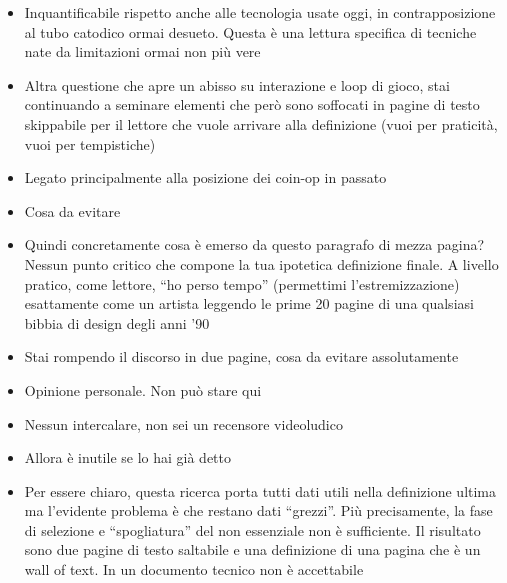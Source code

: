 {\begin{itemize}
  \item {} Inquantificabile rispetto anche alle tecnologia usate oggi, in contrapposizione al tubo catodico ormai desueto. Questa è una lettura specifica di tecniche nate da limitazioni ormai non più vere
  \item {} Altra questione che apre un abisso su interazione e loop di gioco, stai continuando a seminare elementi che però sono soffocati in pagine di testo skippabile per il lettore che vuole arrivare alla definizione (vuoi per praticità, vuoi per tempistiche)
  \item {} Legato principalmente alla posizione dei coin-op in passato
  \item {} Cosa da evitare
  \item {} Quindi concretamente cosa è emerso da questo paragrafo di mezza pagina? Nessun punto critico che compone la tua ipotetica definizione finale. A livello pratico, come lettore, ``ho perso tempo'' (permettimi l'estremizzazione) esattamente come un artista leggendo le prime 20 pagine di una qualsiasi bibbia di design degli anni '90
  \item {} Stai rompendo il discorso in due pagine, cosa da evitare assolutamente
  \item {} Opinione personale. Non può stare qui
  \item {} Nessun intercalare, non sei un recensore videoludico
  \item {} Allora è inutile se lo hai già detto
  \item {} Per essere chiaro, questa ricerca porta tutti dati utili nella definizione ultima ma l'evidente problema è che restano dati ``grezzi''. Più precisamente, la fase di selezione e ``spogliatura'' del non essenziale non è sufficiente. Il risultato sono due pagine di testo saltabile e una definizione di una pagina che è un wall of text. In un documento tecnico non è accettabile

\end{itemize}}
